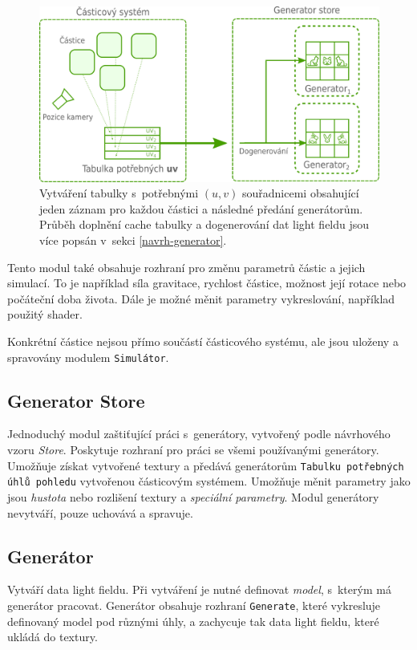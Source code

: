 \begin{figure}[H]
	\centering
		\includegraphics[width=1.0\textwidth]{obrazky-figures/uvdiagram.pdf}
	\caption{Vytváření tabulky s~potřebnými ${(u,v)}$ souřadnicemi obsahující jeden záznam pro každou částici a následné předání generátorům. Průběh doplnění cache tabulky a dogenerování dat light fieldu jsou více popsán v~sekci \ref{navrh-generator}.}
	\label{fig:uv-tabulka}
\end{figure}
\pagebreak
Tento modul také obsahuje rozhraní pro změnu parametrů částic a jejich simulací. To je například síla gravitace, rychlost částice, možnost její rotace nebo počáteční doba života. Dále je možné měnit parametry vykreslování, například použitý shader.

Konkrétní částice nejsou přímo součástí částicového systému, ale jsou uloženy a spravovány modulem \texttt{Simulátor}.

\subsection*{Generator Store} Jednoduchý modul zaštiťující práci s~generátory, vytvořený podle návrhového vzoru \emph{Store}. Poskytuje rozhraní pro práci se všemi používanými generátory. Umožňuje získat vytvořené textury a předává generátorům \texttt{Tabulku potřebných úhlů pohledu} vytvořenou částicovým systémem. Umožňuje měnit parametry jako jsou \emph{hustota} nebo rozlišení textury a \emph{speciální parametry}. Modul generátory nevytváří, pouze uchovává a spravuje. 

\subsection*{Generátor} 
\label{navrh-generator}
Vytváří data light fieldu. Při vytváření je nutné definovat \emph{model}, s~kterým má generátor pracovat. Generátor obsahuje rozhraní \texttt{Generate}, které vykresluje definovaný model pod různými úhly, a zachycuje tak data light fieldu, které ukládá do textury.

